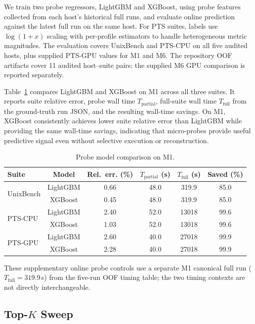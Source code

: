 \documentclass[sigconf, review, anonymous, balance=false]{acmart}
\newcommand{\ptscpu}{PTS-CPU}
\newcommand{\ptsgpu}{PTS-GPU}
\begin{document}
We train two probe regressors, LightGBM and XGBoost, using probe features collected from each host's historical full runs, and evaluate online prediction against the latest full run on the same host.
For PTS suites, labels use \(\log(1+x)\) scaling with per-profile estimators to handle heterogeneous metric magnitudes.
The evaluation covers UnixBench and \ptscpu{} on all five audited hosts, plus supplied PTS-GPU values for M1 and M6. The repository OOF artifacts cover 11 audited host--suite pairs; the supplied M6 GPU comparison is reported separately.

Table~\ref{tab:probe-models} compares LightGBM and XGBoost on M1 across all three suites.
It reports suite relative error, probe wall time \(T_{\mathrm{partial}}\), full-suite wall time \(T_{\mathrm{full}}\) from the ground-truth run JSON, and the resulting wall-time savings.
On M1, XGBoost consistently achieves lower suite relative error than LightGBM while providing the same wall-time savings, indicating that micro-probes provide useful predictive signal even without selective execution or reconstruction.

\begin{table}[t]
\centering
\caption{Probe model comparison on M1.}
\label{tab:probe-models}
\small
\setlength{\tabcolsep}{2pt}
\begin{tabular}{lccccc}
\toprule
\textbf{Suite} & \textbf{Model} & \textbf{Rel.\ err. (\%)} & $T_{\mathrm{partial}}$ (s) & $T_{\mathrm{full}}$ (s) & \textbf{Saved (\%)} \\
\midrule
\multirow{2}{*}{UnixBench}
 & LightGBM & 0.66 & 48.0 & 319.9 & 85.0 \\
 & XGBoost  & 0.45 & 48.0 & 319.9 & 85.0 \\
\midrule
\multirow{2}{*}{\ptscpu}
 & LightGBM & 2.40 & 52.0 & 13018 & 99.6 \\
 & XGBoost  & 1.03 & 52.0 & 13018 & 99.6 \\
\midrule
\multirow{2}{*}{\ptsgpu}
 & LightGBM & 2.60 & 40.0 & 27018 & 99.9 \\
 & XGBoost  & 2.28 & 40.0 & 27018 & 99.9 \\
\bottomrule
\end{tabular}
\end{table}

These supplementary online probe controls use a separate M1 canonical full run ($T_{\mathrm{full}}=319.9$\,s) from the five-run OOF timing table; the two timing contexts are not directly interchangeable.

\subsection{Top-\(K\) Sweep}
\label{subsec:topk-tradeoff}
\end{document}
